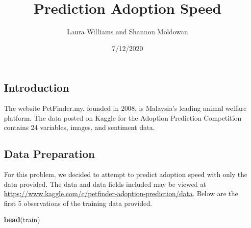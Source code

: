 \documentclass[
]{article}
\title{Prediction Adoption Speed}
\author{Laura Williams and Shannon Moldowan}
\date{7/12/2020}
\newenvironment{Shaded}{\begin{snugshade}}{\end{snugshade}}
\newcommand{\KeywordTok}[1]{\textcolor[rgb]{0.13,0.29,0.53}{\textbf{#1}}}
\newcommand{\NormalTok}[1]{#1}
\begin{document}
\maketitle

\hypertarget{introduction}{%
\subsection{Introduction}\label{introduction}}

The website PetFinder.my, founded in 2008, is Malaysia's leading animal
welfare platform. The data posted on Kaggle for the Adoption Prediction
Competition contains 24 variables, images, and sentiment data.

\hypertarget{data-preparation}{%
\subsection{Data Preparation}\label{data-preparation}}

For this problem, we decided to attempt to predict adoption speed with
only the data provided. The data and data fields included may be viewed
at \url{https://www.kaggle.com/c/petfinder-adoption-prediction/data}.
Below are the first 5 observations of the training data provided.

\begin{Shaded}
\begin{Highlighting}[]
\KeywordTok{head}\NormalTok{(train)}
\end{Highlighting}
\end{Shaded}
\end{document}
